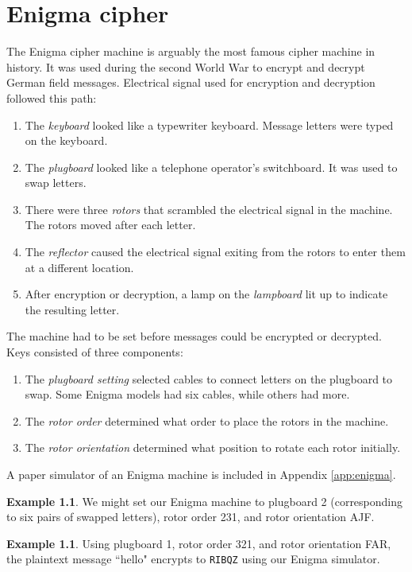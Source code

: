\documentclass{book}
\theoremstyle{plain}
\theoremstyle{definition}
\newtheorem{example}[theorem]{Example}
\newcommand{\ciphertext}[1]{\texttt{#1}} %
\begin{document}
\chapter{Enigma cipher}
The Enigma cipher machine is arguably the most famous cipher machine in history. It was used during the second World War to encrypt and decrypt German field messages. Electrical signal used for encryption and decryption followed this path:
\begin{enumerate}
\item The {\it keyboard} looked like a typewriter keyboard. Message letters were typed on the keyboard.
\item The {\it plugboard} looked like a telephone operator's switchboard. It was used to swap letters.
\item There were three {\it rotors} that scrambled the electrical signal in the machine. The rotors moved after each letter.
\item The {\it reflector} caused the electrical signal exiting from the rotors to enter them at a different location.
\item After encryption or decryption, a lamp on the {\it lampboard} lit up to indicate the resulting letter.
\end{enumerate}

The machine had to be set before messages could be encrypted or decrypted. Keys consisted of three components:
\begin{enumerate}
\item The {\it plugboard setting} selected cables to connect letters on the plugboard to swap. Some Enigma models had six cables, while others had more.
\item The {\it rotor order} determined what order to place the rotors in the machine.
\item The {\it rotor orientation} determined what position to rotate each rotor initially.
\end{enumerate}

A paper simulator of an Enigma machine is included in Appendix \ref{app:enigma}.

\begin{example}
We might set our Enigma machine to plugboard 2 (corresponding to six pairs of swapped letters), rotor order 231, and rotor orientation AJF.
\end{example}

\begin{example}
Using plugboard 1, rotor order 321, and rotor orientation FAR, the plaintext message ``hello" encrypts to \ciphertext{RIBQZ} using our Enigma simulator.
\end{example}
\end{document}
